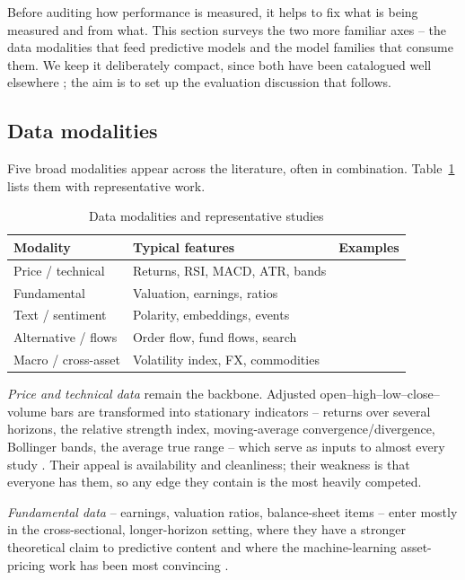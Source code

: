 \documentclass[10pt,a4paper,twocolumn]{article}
\begin{document}
Before auditing how performance is measured, it helps to fix what is being measured and from what. This section surveys the two more familiar axes -- the data modalities that feed predictive models and the model families that consume them. We keep it deliberately compact, since both have been catalogued well elsewhere \cite{sezer2020,kumbure2022}; the aim is to set up the evaluation discussion that follows.

\subsection{Data modalities}

Five broad modalities appear across the literature, often in combination. Table~\ref{tab:data} lists them with representative work.

\begin{table}[tb]
\centering
\caption{Data modalities and representative studies}
\label{tab:data}
{\footnotesize
\begin{tabular}{p{2.0cm} p{3.0cm} p{1.7cm}}
\toprule
\textbf{Modality} & \textbf{Typical features} & \textbf{Examples} \\
\midrule
Price / technical & Returns, RSI, MACD, ATR, bands & \cite{patel2015,selvin2017} \\
Fundamental & Valuation, earnings, ratios & \cite{gu2020} \\
Text / sentiment & Polarity, embeddings, events & \cite{bollen2011,ding2015,araci2019} \\
Alternative / flows & Order flow, fund flows, search & \cite{thakkar2021} \\
Macro / cross-asset & Volatility index, FX, commodities & \cite{gu2020} \\
\bottomrule
\end{tabular}}
\end{table}

\textit{Price and technical data} remain the backbone. Adjusted open--high--low--close--volume bars are transformed into stationary indicators -- returns over several horizons, the relative strength index, moving-average convergence/divergence, Bollinger bands, the average true range -- which serve as inputs to almost every study \cite{patel2015}. Their appeal is availability and cleanliness; their weakness is that everyone has them, so any edge they contain is the most heavily competed.

\textit{Fundamental data} -- earnings, valuation ratios, balance-sheet items -- enter mostly in the cross-sectional, longer-horizon setting, where they have a stronger theoretical claim to predictive content and where the machine-learning asset-pricing work has been most convincing \cite{gu2020}.
\end{document}
